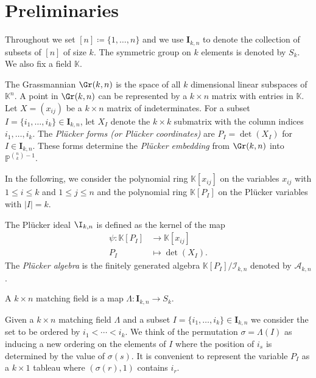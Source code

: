 \section{Preliminaries}\label{prelim} 

Throughout we set $[n]\coloneqq \{1, \ldots , n\}$ and we use $\mathbf{I}_{k, n}$ to denote the collection of subsets of $[n]$ of size $k$. The symmetric group on $k$ elements is denoted by $S_k$. We also fix a field $\mathbb{K}$. 

\smallskip

The Grassmannian $\Gr(k, n)$ is the space of all $k$ dimensional linear subspaces of $\mathbb{K}^n$. A point in $\Gr(k, n)$ can be represented by a $k\times n$ matrix with entries in $\mathbb{K}$. 
Let $X=(x_{ij})$ be a $k\times n$ matrix of indeterminates. For a subset $I = \{i_1,\ldots,i_k\} \in \mathbf{I}_{k, n}$, let $X_I$ denote the $k\times k$ submatrix with the column indices $i_1,\ldots,i_k$. 
The \emph{Pl{\"u}cker forms (or Pl{\"u}cker coordinates)} are $P_I = \det (X_I)$ for $I \in\mathbf{I}_{k, n}$. These forms determine the \emph{Pl{\"u}cker embedding} from
$ \Gr (k,n)$ into $\mathbb{P}^{\binom{n}{k}-1}$. 

In the following, we consider the polynomial ring $\mathbb{K}[x_{ij}]$ on the variables $x_{ij}$ with $1\leq i\leq k$ and $1\leq j\leq n$ and the polynomial ring $\mathbb{K}[P_I]$ on the Pl{\"u}cker variables with $|I|=k$.

\begin{Definition}\label{def:ideal}The Pl{\"u}cker ideal $\I_{k,n}$ is defined as the kernel of the map 
\begin{equation}\label{eqn:pluckermap}
\begin{aligned} 
\psi \colon \mathbb{K}[P_I] &\rightarrow \mathbb{K}[x_{ij}] 
\\ 
 P_{I} &\mapsto \det (X_I).
\end{aligned}
\end{equation}
The \emph{Pl{\"u}cker algebra} is the finitely generated algebra $\mathbb{K}[P_I ]/{\mathcal{I}_{k,n}}$ 
denoted by $\mathcal{A}_{k,n}$.
\end{Definition}




\begin{Definition}\label{def:matching}
A $k\times n$ matching field is a map $\Lambda: \mathbf{I}_{k,n} \to S_k$.
\end{Definition}

Given a $k\times n$ matching field $\Lambda$ and a subset $I = \{i_1, \ldots , i_k\} \in \mathbf{I}_{k, n}$ 
we consider the set to be ordered by $i_1 < \cdots < i_{k}$. We think of the permutation {$\sigma=\Lambda(I)$} as inducing a new ordering on the elements of $I$ 
where the position of $i_s$ is determined by the value of $\sigma(s)$.
It is convenient to represent the variable $P_I$ as a $k \times 1$ tableau 
 where $(\sigma(r), 1)$ contains $i_{r}$.

